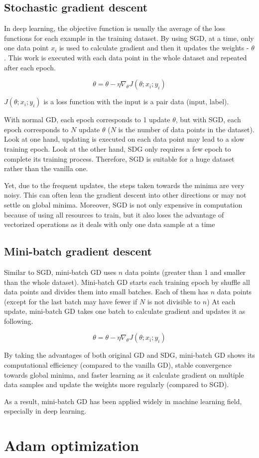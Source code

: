 	\subsection{Stochastic gradient descent}
	\noindent

	In deep learning, the objective function is usually the average of the loss functions for each example in the training dataset. By using SGD, at a time, only one data point $x_i$ is used to calculate gradient and then it updates the weights -  $\theta$. This work is executed with each data point in the whole dataset and repeated after each epoch. 
	
	\[\theta = \theta - \eta \nabla_{\theta} J(\theta; x_i; y_i)\]
	
	\noindent
	$ J(\theta; x_i; y_i)$ is a loss function with the input is a pair data (input, label).
	
	With normal GD, each epoch corresponds to 1 update $\theta$, but with SGD, each epoch corresponds to $N$ update $\theta$ ($N$ is the number of data points in the dataset). Look at one hand, updating is executed on each data point may lead to a slow training epoch. Look at the other hand, SDG only requires a few epoch to complete its training process. Therefore, SGD is suitable for a huge dataset rather than the vanilla one.
	
	Yet, due to the frequent updates, the steps taken towards the minima are very noisy. This can often lean the gradient descent into other directions or may not settle on global minima. Moreover, SGD is not only expensive in computation because of using all resources to train, but it also loses the advantage of vectorized operations as it deals with only one data sample at a time
	
	
	\subsection{Mini-batch gradient descent}
	\noindent
	
	Similar to SGD, mini-batch GD uses $n$ data points (greater than 1 and smaller than the whole dataset). Mini-batch GD starts each training epoch by shuffle all data points and divides them into small batches. Each of them has $n$ data points (except for the last batch may have fewer if $N$ is not divisible to $n$) At each update, mini-batch GD takes one batch to calculate gradient and updates it as following.
	
	\[ \theta = \theta - \eta \nabla_{\theta} J(\theta; x_i; y_i) \]
	
	\noindent
	By taking the advantages of both original GD and SDG, mini-batch GD shows its computational efficiency (compared to the vanilla GD), stable convergence towards global minima, and faster learning as it calculate gradient on multiple data samples and update the weights more regularly (compared to SGD).
	
	As a result, mini-batch GD has been applied widely in machine learning field, especially in deep learning.

\section{Adam optimization}
	
	
	